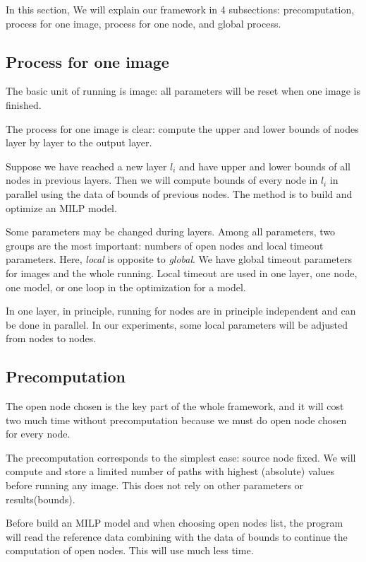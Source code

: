 \documentclass{llncs}
\begin{document}

In this section, We will explain our framework in 4 subsections: precomputation, process for one image, process for one node, and global process.

\subsection{Process for one image}

The basic unit of running is image: all parameters will be reset when one image is finished.

The process for one image is clear: compute the upper and lower bounds of nodes layer by layer to the output layer. 

Suppose we have reached a new layer $l_i$ and have upper and lower bounds of all nodes in previous layers. Then we will compute bounds of every node in $l_i$ in parallel using the data of bounds of previous nodes. The method is to build and optimize an MILP model.

Some parameters may be changed during layers. Among all parameters, two groups are the most important: numbers of open nodes and local timeout parameters. Here, \emph{local} is opposite to \emph{global}. We have global timeout parameters for images and the whole running. Local timeout are used in one layer, one node, one model, or one loop in the optimization for a model.

In one layer, in principle, running for nodes are in principle independent and can be done in parallel. In our experiments, some local parameters will be adjusted from nodes to nodes.

\subsection{Precomputation}

The open node chosen is the key part of the whole framework, and it will cost two much time without precomputation because we must do open node chosen for every node. 

The precomputation corresponds to the simplest case: source node fixed. We will compute and store a limited number of paths with highest (absolute) values before running any image. This does not rely on other parameters or results(bounds).

Before build an MILP model and when choosing open nodes list,  the program will read the reference data combining with the data of bounds to continue the computation of open nodes. This will use much less time.
\end{document}
